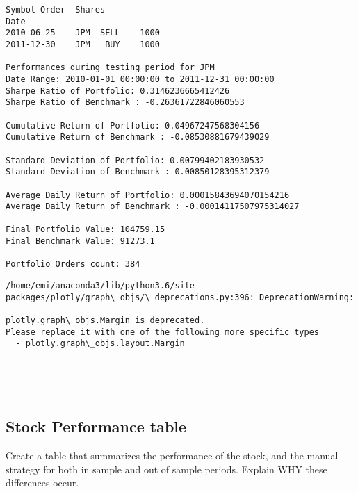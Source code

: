 \documentclass[11pt]{article}
\begin{document}
    \begin{Verbatim}[commandchars=\\\{\}]
           Symbol Order  Shares
Date                           
2010-06-25    JPM  SELL    1000
2011-12-30    JPM   BUY    1000

Performances during testing period for JPM
Date Range: 2010-01-01 00:00:00 to 2011-12-31 00:00:00
Sharpe Ratio of Portfolio: 0.3146236665412426
Sharpe Ratio of Benchmark : -0.26361722846060553

Cumulative Return of Portfolio: 0.04967247568304156
Cumulative Return of Benchmark : -0.08530881679439029

Standard Deviation of Portfolio: 0.00799402183930532
Standard Deviation of Benchmark : 0.00850128395312379

Average Daily Return of Portfolio: 0.00015843694070154216
Average Daily Return of Benchmark : -0.00014117507975314027

Final Portfolio Value: 104759.15
Final Benchmark Value: 91273.1

Portfolio Orders count: 384

    \end{Verbatim}

    \begin{Verbatim}[commandchars=\\\{\}]
/home/emi/anaconda3/lib/python3.6/site-packages/plotly/graph\_objs/\_deprecations.py:396: DeprecationWarning:

plotly.graph\_objs.Margin is deprecated.
Please replace it with one of the following more specific types
  - plotly.graph\_objs.layout.Margin



    \end{Verbatim}

    \begin{center}
    \end{center}
    { \hspace*{\fill} \\}
    
    \subsection{Stock Performance table}\label{stock-performance-table}

Create a table that summarizes the performance of the stock, and the
manual strategy for both in sample and out of sample periods. Explain
WHY these differences occur.
\end{document}

